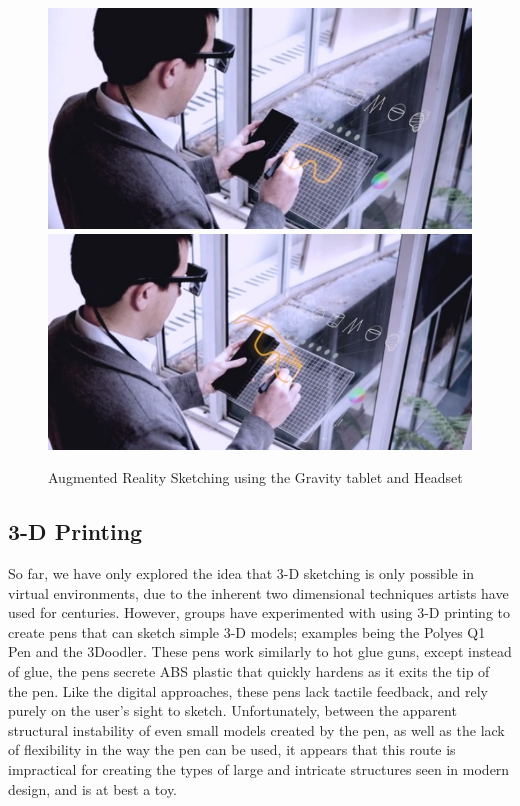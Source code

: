 \documentclass[11pt]{report}
\begin{document}
\begin{figure}
\includegraphics[width=\textwidth]{gravity1.png}
\includegraphics[width=\textwidth]{gravity2.png}
\caption{Augmented Reality Sketching using the Gravity tablet and Headset}
\end{figure}

\subsection{3-D Printing}

So far, we have only explored the idea that 3-D sketching is only possible in virtual environments, due to the inherent two dimensional techniques artists have used for centuries.  
However, groups have experimented with using 3-D printing to create pens that can sketch simple 3-D models; examples being the Polyes Q1 Pen and the 3Doodler.
These pens work similarly to hot glue guns, except instead of glue, the pens secrete ABS plastic that quickly hardens as it exits the tip of the pen.
Like the digital approaches, these pens lack tactile feedback, and rely purely on the user's sight to sketch.
Unfortunately, between the apparent structural instability of even small models created by the pen, as well as the lack of flexibility in the way the pen can be used, it appears that this route is impractical for creating the types of large and intricate structures seen in modern design, and is at best a toy.
\end{document}

